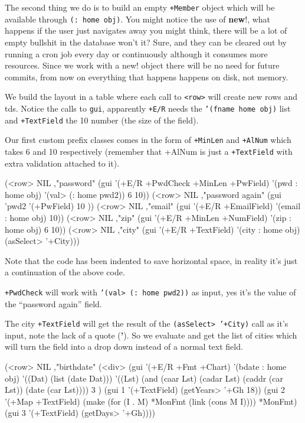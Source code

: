 The second thing we do is to build an empty \texttt{+Member} object
which will be available through \texttt{(: home obj)}. You might
notice the use of \textbf{new}!, what happens if the user just
navigates away you might think, there will be a lot of empty bullshit
in the database won't it? Sure, and they can be cleared out by running
a cron job every day or continuously although it consumes more
resources. Since we work with a new! object there will be no need for
future commits, from now on everything that happens happens on disk,
not memory.

We build the layout in a table where each call to
\texttt{\textless{}row\textgreater{}} will create new rows and tds.
Notice the calls to \texttt{gui}, apparently \texttt{+E/R} needs the
\texttt{'(fname home obj)} list and \texttt{+TextField} the 10 number
(the size of the field).

Our first custom prefix classes comes in the form of \texttt{+MinLen}
and \texttt{+AlNum} which takes 6 and 10 respectively (remember that
+AlNum is just a \texttt{+TextField} with extra validation attached to
it).

\begin{wideverbatim}
(<row> NIL ,"password"       
   (gui 
      '(+E/R +PwdCheck +MinLen +PwField) 
      '(pwd : home obj) 
      '(val> (: home pwd2)) 6 10))
(<row> NIL ,"password again" (gui 'pwd2 '(+PwField) 10 ))
(<row> NIL ,"email" (gui '(+E/R +EmailField)       '(email : home obj) 10))
(<row> NIL ,"zip"   (gui '(+E/R +MinLen +NumField) '(zip : home obj) 6 10))
(<row> NIL ,"city"  (gui '(+E/R +TextField)        '(city : home obj) (asSelect> '+City)))
\end{wideverbatim}

Note that the code has been indented to save horizontal space, in
reality it's just a continuation of the above code.

\texttt{+PwdCheck} will work with \texttt{'(val> (: home pwd2))} as
input, yes it's the value of the ``password again'' field.

The city \texttt{+TextField} will get the result of the \texttt{(asSelect>
'+City)} call as it's input, note the lack of a quote (\textbf{'}). So
we evaluate and get the list of cities which will turn the field into
a drop down instead of a normal text field.

\begin{wideverbatim}
(<row> NIL ,"birthdate" 
   (<div> 
      (gui '(+E/R +Fmt +Chart) '(bdate : home obj)
         '((Dat) (list (date Dat)))
         '((Lst) (and (caar Lst) (cadar Lst) (caddr (car Lst)) (date (car Lst))))
         3 )
      (gui 1 '(+TextField) (getYears> '+Gh 18))
      (gui 2 '(+Map +TextField)
         (make 
            (for (I . M) *MonFmt 
               (link (cons M I))))
         *MonFmt)
      (gui 3 '(+TextField) (getDays> '+Gh))))
\end{wideverbatim}

